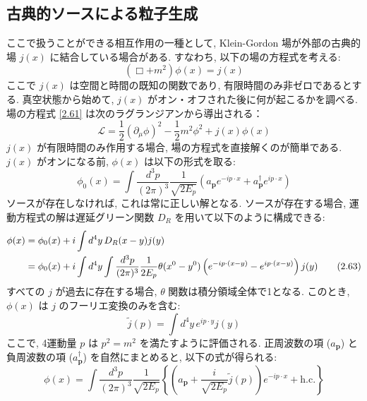 \documentclass[a4paper,12pt]{article}
\begin{document}
\subsection*{古典的ソースによる粒子生成}
ここで扱うことができる相互作用の一種として, Klein-Gordon 場が外部の古典的場 $j(x)$ に結合している場合がある. すなわち, 以下の場の方程式を考える:
\begin{equation*}
(\Box + m^2) \phi(x) = j(x) \label{2.61}\tag{2.61}
\end{equation*}
ここで $j(x)$ は空間と時間の既知の関数であり, 有限時間のみ非ゼロであるとする. 真空状態から始めて, $j(x)$ がオン・オフされた後に何が起こるかを調べる.\\
場の方程式 \eqref{2.61} は次のラグランジアンから導出される：
\begin{equation*}
\mathcal{L} = \frac{1}{2} (\partial_\mu \phi)^2 - \frac{1}{2} m^2 \phi^2 + j(x) \phi(x) \tag{2.62}
\end{equation*}
$j(x)$ が有限時間のみ作用する場合, 場の方程式を直接解くのが簡単である. $j(x)$ がオンになる前, $\phi(x)$ は以下の形式を取る:
\begin{equation*}
\phi_0(x) = \int \frac{d^3 p}{(2\pi)^3} \frac{1}{\sqrt{2E_p}} \left( a_{\mathbf{p}} e^{-ip \cdot x} + a_{\mathbf{p}}^\dagger e^{ip \cdot x} \right)
\end{equation*}
ソースが存在しなければ, これは常に正しい解となる. ソースが存在する場合, 運動方程式の解は遅延グリーン関数 $D_R$ を用いて以下のように構成できる:
\begin{align*}
\phi(x) &= \phi_0(x) + i \int d^4 y\, D_R(x - y) j(y) \notag \\
&= \phi_0(x) + i \int d^4 y \int \frac{d^3 p}{(2\pi)^3} \frac{1}{2E_p} \theta(x^0 - y^0) \left( e^{-ip \cdot (x - y)} - e^{ip \cdot (x - y)} \right) j(y) \label{2.63}\tag{2.63}
\end{align*}
すべての $j$ が過去に存在する場合, $\theta$ 関数は積分領域全体で1となる. このとき, $\phi(x)$ は $j$ のフーリエ変換のみを含む:
\begin{equation*}
\tilde{j}(p) = \int d^4 y\, e^{ip \cdot y} j(y)
\end{equation*}
ここで, 4運動量 $p$ は $p^2 = m^2$ を満たすように評価される. 正周波数の項 ($a_{\mathbf{p}}$) と負周波数の項 ($a_{\mathbf{p}}^\dagger$) を自然にまとめると, 以下の式が得られる:
\begin{equation*}
\phi(x) = \int \frac{d^3 p}{(2\pi)^3} \frac{1}{\sqrt{2E_p}} \left\{ \left( a_{\mathbf{p}} + \frac{i}{\sqrt{2E_p}} \tilde{j}(p) \right) e^{-ip \cdot x} + \text{h.c.} \right\} \label{2.64}\tag{2.64}
\end{equation*}
\end{document}
